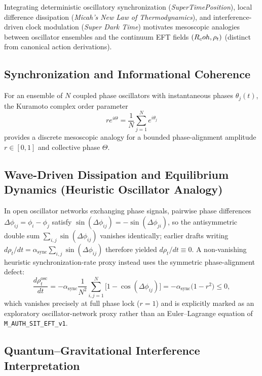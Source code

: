 Integrating deterministic oscillatory synchronization (\emph{SuperTimePosition}), local difference dissipation (\emph{Micah's New Law of Thermodynamics}), and interference-driven clock modulation (\emph{Super Dark Time}) motivates mesoscopic analogies between oscillator ensembles and the continuum EFT fields $(R_coh, \rho_t)$ (distinct from canonical action derivations).

\subsection{Synchronization and Informational Coherence}

For an ensemble of $N$ coupled phase oscillators with instantaneous phases $\theta_j(t)$, the Kuramoto complex order parameter
\begin{equation}
r e^{i\Theta} = \frac{1}{N}\sum_{j=1}^N e^{i\theta_j}
\label{eq:kuramoto_order_sec4}
\end{equation}
provides a discrete mesoscopic analogy for a bounded phase-alignment amplitude $r \in [0,1]$ and collective phase $\Theta$.

\subsection{Wave-Driven Dissipation and Equilibrium Dynamics (Heuristic Oscillator Analogy)}

In open oscillator networks exchanging phase signals, pairwise phase differences $\Delta\phi_{ij} = \phi_i - \phi_j$ satisfy $\sin(\Delta\phi_{ij}) = -\sin(\Delta\phi_{ji})$, so the antisymmetric double sum $\sum_{i,j}\sin(\Delta\phi_{ij})$ vanishes identically; earlier drafts writing $d\rho_t/dt = \alpha_{\mathrm{sync}}\sum_{i,j}\sin(\Delta\phi_{ij})$ therefore yielded $d\rho_t/dt \equiv 0$. A non-vanishing heuristic synchronization-rate proxy instead uses the symmetric phase-alignment defect:
\begin{equation}
\frac{d\rho_t^{\mathrm{osc}}}{dt} = -\alpha_{\mathrm{sync}}\frac{1}{N^2}\sum_{i,j=1}^N \bigl[1 - \cos(\Delta\phi_{ij})\bigr] = -\alpha_{\mathrm{sync}}\bigl(1 - r^2\bigr) \le 0,
\end{equation}
which vanishes precisely at full phase lock ($r = 1$) and is explicitly marked as an exploratory oscillator-network proxy rather than an Euler--Lagrange equation of \texttt{M\_AUTH\_SIT\_EFT\_v1}.

\subsection{Quantum--Gravitational Interference Interpretation}

